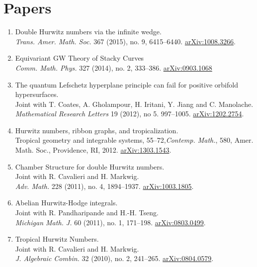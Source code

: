 \documentclass[11pt,letterpaper]{article}
\begin{document}
\section*{Papers }
\begin{enumerate}
\item Double Hurwitz numbers via the infinite wedge. \\
\emph{Trans. Amer. Math. Soc.} 367 (2015), no. 9, 6415--6440. \href{http://arxiv.org/abs/1008.3266}{arXiv:1008.3266}.

\item Equivariant GW Theory of Stacky Curves \\  \emph{Comm. Math. Phys.} 327 (2014), no. 2, 333--386. \href{http://arxiv.org/abs/0903.1068}{arXiv:0903.1068}
\item The quantum Lefschetz hyperplane principle can fail for positive orbifold hypersurfaces. \\
 Joint with T. Coates, A. Gholampour, H. Iritani, Y. Jiang and C. Manolache. \\
   \emph{Mathematical Research Letters} 19 (2012), no 5. 997--1005.
\href{http://arxiv.org/abs/1202.2754}{arXiv:1202.2754}.
\item Hurwitz numbers, ribbon graphs, and tropicalization. \\ Tropical
  geometry and integrable systems, 55--72,\emph{Contemp. Math.}, 580,
  Amer. Math. Soc., Providence, RI, 2012.
\href{http://arxiv.org/abs/1303.1543}{arXiv:1303.1543}.
\item Chamber Structure for double Hurwitz numbers.
\\ Joint with R. Cavalieri and H. Markwig. \\ \emph{Adv. Math.} 228 (2011), no. 4,
  1894--1937.
\href{http://arxiv.org/abs/1003.1805}{arXiv:1003.1805}.
 \item Abelian Hurwitz-Hodge integrals. \\ 
Joint with R. Pandharipande and H.-H. Tseng.  \\  
\emph{Michigan Math. J.} 60 (2011), no. 1, 171--198.
\href{http://arxiv.org/abs/0803.0499}{arXiv:0803.0499}.
\item Tropical Hurwitz Numbers. \\
 Joint with R. Cavalieri and H. Markwig. \\
\emph{J. Algebraic Combin.} 32 (2010), no. 2, 241--265. 
\href{http://arxiv.org/abs/0804.0579}{arXiv:0804.0579}.


\end{enumerate}
\end{document}

